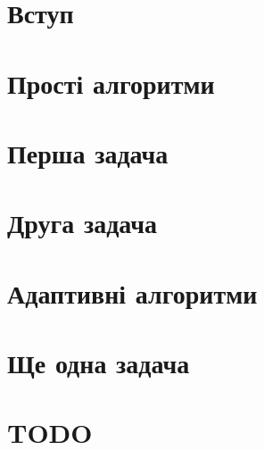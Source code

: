 \documentclass[a4paper,14pt,openany,oneside,oldfontcommands]{memoir}
\begin{document}
 
\newpage
\tableofcontents
\newpage

\setcounter{page}{3}

\chapter{Вступ}

\newpage

\chapter{Прості алгоритми}

\newpage

\newpage

\chapter{Перша задача}

\newpage

\newpage

\chapter{Друга задача}

\newpage

\newpage

\chapter{Адаптивні алгоритми}

\newpage

\newpage

\newpage

\chapter{Ще одна задача}

\newpage

\newpage

\chapter{TODO}

\end{document}
